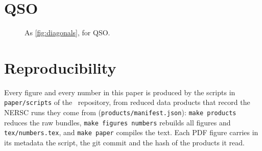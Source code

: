 \section{QSO}
\label{app:qso}

\begin{figure}[h]
  \centering{}
  \caption{As \cref{fig:diagonals}, for QSO.}
  \label{fig:diagonals_qso}
\end{figure}

\section{Reproducibility}
\label{app:repro}

Every figure and every number in this paper is produced by the scripts in \texttt{paper/scripts} of the \thecov\ repository, from reduced data products that record the NERSC runs they come from (\texttt{products/manifest.json}): \texttt{make products} reduces the raw bundles, \texttt{make figures numbers} rebuilds all figures and \texttt{tex/numbers.tex}, and \texttt{make paper} compiles the text. Each PDF figure carries in its metadata the script, the git commit and the hash of the products it read.
